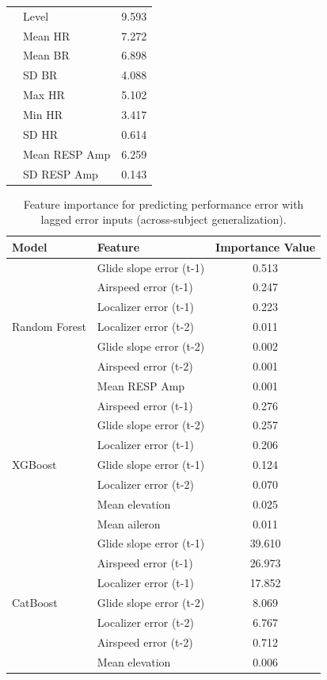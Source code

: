 \documentclass[11pt, a4paper]{article}
\begin{document}
\begin{table}[htbp]
\begin{tabular}{llc}
										&Level      &  9.593 \\
										&Mean HR             &  7.272 \\
										&Mean BR             &  6.898 \\
										&SD BR              &  4.088 \\
										&Max HR             &  5.102 \\
										&Min HR              &  3.417 \\
										&SD HR             &  0.614 \\
										&Mean RESP Amp       &  6.259 \\
										&SD RESP Amp		&  0.143 \\				
		\bottomrule
	\end{tabular}
\end{table}

\begin{table}[htbp]
	\caption{Feature importance for predicting performance error with lagged error inputs (across-subject generalization).}
	\label{tab:feat-imp-sub-lag}
	\centering
	\small
	\begin{tabular}{llc}
		\toprule
		Model & Feature & Importance Value \\
		\midrule
		\multirow{7}{*}{Random Forest} 	& Glide slope error (t-1) &0.513\\
										& Airspeed error (t-1)    & 0.247\\
										& Localizer error (t-1) 	&0.223\\
										&Localizer error (t-2)		&0.011\\
										&Glide slope error (t-2)	&0.002\\
										&Airspeed error (t-2)		&0.001\\
										&Mean RESP Amp 				&0.001\\
		\midrule
		\multirow{7}{*}{XGBoost} 		&Airspeed error (t-1)		& 0.276\\
										&Glide slope error (t-2)	&0.257\\
										&Localizer error (t-1)		&0.206\\
										&Glide slope error (t-1)	&0.124\\
										&Localizer error (t-2)		&0.070\\
										&Mean elevation 			&0.025\\
										&Mean aileron				&0.011\\
		\midrule
		\multirow{7}{*}{CatBoost}		&Glide slope error (t-1)	&39.610\\
										&Airspeed error (t-1)		&26.973\\
										&Localizer error (t-1)		&17.852\\
										&Glide slope error (t-2)	&8.069\\
										&Localizer error (t-2)		&6.767\\
										&Airspeed error (t-2)		&0.712\\
										&Mean elevation 			&0.006\\
		\bottomrule
	\end{tabular}
\end{table}
\end{document}
